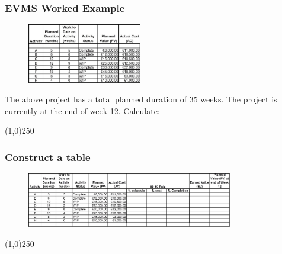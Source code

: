 \begin{frame}
\frametitle{EVMS Worked Example}
\begin{figure}
	\centering
		\includegraphics[width = 5cm]{images/evmsdata.jpg}
	\label{fig:evmsdata}
\end{figure}
The above project has a total planned duration of 35 weeks.  The project is currently at the end of week 12.  Calculate:

\begin{table}
	\centering
\end{table}
\end{frame}
\begin{center}\line(1,0){250}\end{center}






\begin{frame}
\frametitle{Construct a table}
\begin{figure}
	\centering
		\includegraphics[width = 9cm]{images/evmstable.jpg}
	\label{fig:evmstable}
\end{figure}


\end{frame}
\begin{center}\line(1,0){250}\end{center}






